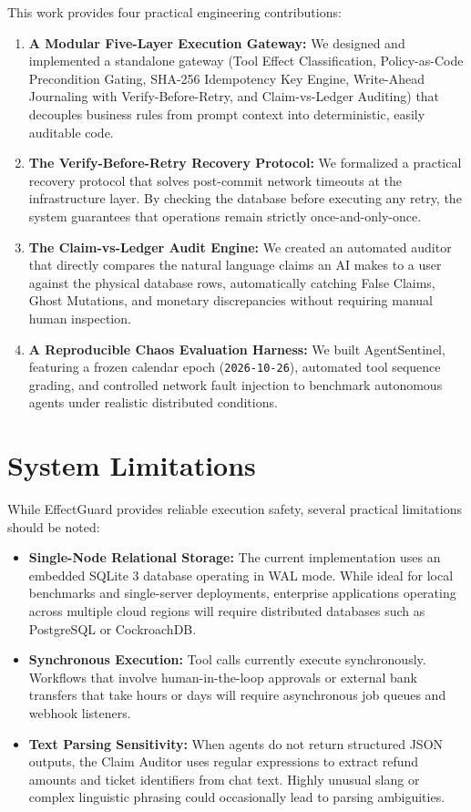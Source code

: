This work provides four practical engineering contributions:

\begin{enumerate}
    \item \textbf{A Modular Five-Layer Execution Gateway:}
    We designed and implemented a standalone gateway (Tool Effect Classification, Policy-as-Code Precondition Gating, SHA-256 Idempotency Key Engine, Write-Ahead Journaling with Verify-Before-Retry, and Claim-vs-Ledger Auditing) that decouples business rules from prompt context into deterministic, easily auditable code.

    \item \textbf{The Verify-Before-Retry Recovery Protocol:}
    We formalized a practical recovery protocol that solves post-commit network timeouts at the infrastructure layer. By checking the database before executing any retry, the system guarantees that operations remain strictly once-and-only-once.

    \item \textbf{The Claim-vs-Ledger Audit Engine:}
    We created an automated auditor that directly compares the natural language claims an AI makes to a user against the physical database rows, automatically catching False Claims, Ghost Mutations, and monetary discrepancies without requiring manual human inspection.

    \item \textbf{A Reproducible Chaos Evaluation Harness:}
    We built AgentSentinel, featuring a frozen calendar epoch (\texttt{2026-10-26}), automated tool sequence grading, and controlled network fault injection to benchmark autonomous agents under realistic distributed conditions.
\end{enumerate}

\section{System Limitations}

While EffectGuard provides reliable execution safety, several practical limitations should be noted:

\begin{itemize}
    \item \textbf{Single-Node Relational Storage:} The current implementation uses an embedded SQLite 3 database operating in WAL mode. While ideal for local benchmarks and single-server deployments, enterprise applications operating across multiple cloud regions will require distributed databases such as PostgreSQL or CockroachDB.
    \item \textbf{Synchronous Execution:} Tool calls currently execute synchronously. Workflows that involve human-in-the-loop approvals or external bank transfers that take hours or days will require asynchronous job queues and webhook listeners.
    \item \textbf{Text Parsing Sensitivity:} When agents do not return structured JSON outputs, the Claim Auditor uses regular expressions to extract refund amounts and ticket identifiers from chat text. Highly unusual slang or complex linguistic phrasing could occasionally lead to parsing ambiguities.
\end{itemize}

